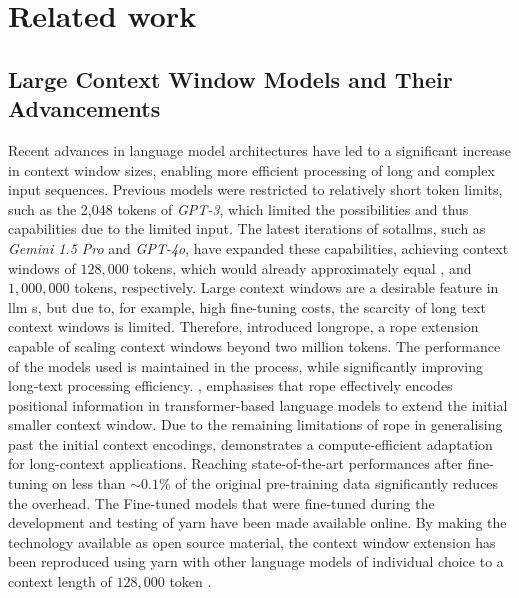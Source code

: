 \chapter{Related work}\label{ch:relatedWork}

\section{Large Context Window Models and Their Advancements}\label{sec:large-context}

Recent advances in language model architectures have led to a significant increase in context window sizes, enabling more efficient processing of long and complex input sequences. 
Previous models were restricted to relatively short token limits, such as the 2,048 tokens of \textit{GPT-3}, which limited the possibilities and thus capabilities due to the limited input.
The latest iterations of \ac{sota}\ac{llm}s, such as \textit{Gemini 1.5 Pro} and \textit{GPT-4o}, have expanded these capabilities, achieving context windows of $128,000$ tokens, which would already approximately equal \cite{bb2}, and $1{,}000{,}000$ tokens, respectively. 
%
Large context windows are a desirable feature in \ac{llm} s, but due to, for example, high fine-tuning costs, the scarcity of long text context windows is limited\citep{ding2024longrope}.
Therefore, \citet{ding2024longrope} introduced \ac{longrope}, a \ac{rope} extension capable of scaling context windows beyond two million tokens.
The performance of the models used is maintained in the process, while significantly improving long-text processing efficiency\citep{ding2024longrope}.
\citet{peng2024yarn}, emphasises that \ac{rope} effectively encodes positional information in transformer-based language models to extend the initial smaller context window. 
Due to the remaining limitations of \ac{rope} in generalising past the initial context encodings, \citet{peng2024yarn} demonstrates a compute-efficient adaptation for long-context applications.
Reaching state-of-the-art performances after fine-tuning on less than $\sim0.1\%$ of the original pre-training data significantly reduces the overhead.\citep{peng2024yarn}
The Fine-tuned models that were fine-tuned during the development and testing of \ac{yarn} have been made available online.
By making the technology available as open source material, the context window extension has been reproduced using \ac{yarn} with other language models of individual choice to a context length of $128,000$ token \citep{peng2024yarn}.
